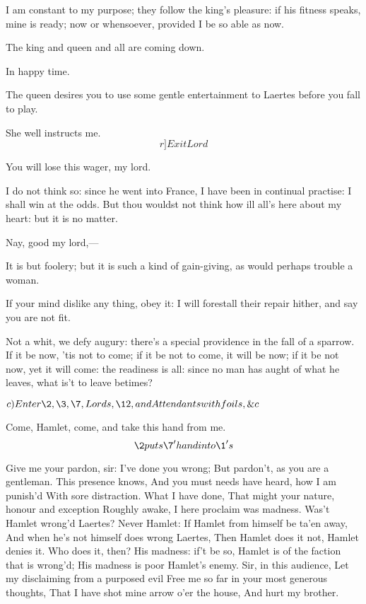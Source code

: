 \documentclass[11pt]{book}
\begin{document}
\1	I am constant to my purpose; they follow the king's
	pleasure: if his fitness speaks, mine is ready; now
	or whensoever, provided I be so able as now.

	The king and queen and all are coming down.

\1	In happy time.

	The queen desires you to use some gentle
	entertainment to Laertes before you fall to play.

\1	She well instructs me. 	\[r]Exit Lord\]

\6	You will lose this wager, my lord.

\1	I do not think so: since he went into France, I
	have been in continual practise: I shall win at the
	odds. But thou wouldst not think how ill all's here
	about my heart: but it is no matter.

\6	Nay, good my lord,---

\1	It is but foolery; but it is such a kind of
	gain-giving, as would perhaps trouble a woman.

\6	If your mind dislike any thing, obey it: I will
	forestall their repair hither, and say you are not
	fit.

\1	Not a whit, we defy augury: there's a special
	providence in the fall of a sparrow. If it be now,
	'tis not to come; if it be not to come, it will be
	now; if it be not now, yet it will come: the
	readiness is all: since no man has aught of what he
	leaves, what is't to leave betimes?

\endProsa

	\(c)Enter \2, \3, \7,\\
	 Lords, \12, and Attendants with foils, \&c\)

\2	Come, Hamlet, come, and take this hand from me.
	\[\2 puts \7' hand into \1's\]

\1	Give me your pardon, sir: I've done you wrong;
	But pardon't, as you are a gentleman.
	This presence knows,
	And you must needs have heard, how I am punish'd
	With sore distraction. What I have done,
	That might your nature, honour and exception
	Roughly awake, I here proclaim was madness.
	Was't Hamlet wrong'd Laertes? Never Hamlet:
	If Hamlet from himself be ta'en away,
	And when he's not himself does wrong Laertes,
	Then Hamlet does it not, Hamlet denies it.
	Who does it, then? His madness: if't be so,
	Hamlet is of the faction that is wrong'd;
	His madness is poor Hamlet's enemy.
	Sir, in this audience,
	Let my disclaiming from a purposed evil
	Free me so far in your most generous thoughts,
	That I have shot mine arrow o'er the house,
	And hurt my brother. \\
\end{document}
